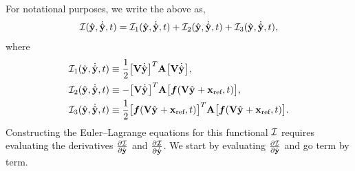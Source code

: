 \documentclass[3p,computermodern,10pt]{elsarticle}
\begin{document}
\begin{appendices}
\begin{equation}
\end{equation}
For notational purposes, we write the above as,
$$  \minintegrand(\genstateyDiscrete,\dot{\genstateyDiscrete},t) =  \minintegrand_1(\genstateyDiscrete,\genstateyDiscreteDot,t) +  \minintegrand_2(\genstateyDiscrete,\genstateyDiscreteDot,t) +  \minintegrand_3(\genstateyDiscrete,\genstateyDiscreteDot,t),$$
where
\begin{align*}
&\minintegrand_1(\genstateyDiscrete,\genstateyDiscreteDot,t) \equiv  \frac{1}{2}\big[\basisspace \genstateyDiscreteDotArgnt{}  \big]^T  \stweightingMatArg{n}  \big[ \basisspace \genstateyDiscreteDotArgnt{} \big], \\
&   \minintegrand_2(\genstateyDiscrete,\genstateyDiscreteDot,t) \equiv   -  \big[ \basisspace \genstateyDiscreteDotArgnt{} \big]^T \stweightingMatArg{n} \big[ \velocity(\veloargsromy) \big], \\
&  \minintegrand_3(\genstateyDiscrete,\genstateyDiscreteDot,t) \equiv  \frac{1}{2}\big[\velocity(\veloargsromy) \big]^T \stweightingMatArg{n} \big[ \velocity(\veloargsromy) \big] . 
\end{align*}
Constructing the Euler--Lagrange equations for this functional $\minintegrand$ requires evaluating the derivatives $\frac{\partial \minintegrand}{\partial \genstateyDiscrete}$ and $\frac{\partial \minintegrand}{\partial \genstateyDiscreteDot}$. We start by evaluating $\frac{\partial \minintegrand}{\partial \genstateyDiscrete}$ and go term by term.


\end{appendices}
\end{document}
